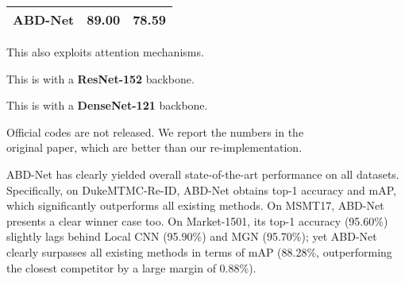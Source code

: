 \documentclass[10pt,twocolumn]{article}
\begin{document}
\begin{table}[ht]
\begin{center}
\begin{threeparttable}
{\begin{tabular}{c|c|c}
\textbf{ABD-Net} & {\color{red}89.00} & {\color{red}78.59} \\
\hline
\end{tabular}}
\begin{tablenotes}
\footnotesize
\item[] This also exploits attention mechanisms.
\item[] This is with a \textbf{ResNet-152} backbone.
\item[] This is with a \textbf{DenseNet-121} backbone.
\item[] Official codes are not released. We report the numbers in the \\ original paper, which are better than our re-implementation. 
\end{tablenotes}
\end{threeparttable}
\end{center}
\vspace{-3mm}
\end{table}

\begin{table}[ht]
\begin{center}
\caption{Comparison to state-of-the-art methods on MSMT17.}
\vspace{0.5em}
\label{table:sota_msmt}
\end{center}
\vspace{-2mm}
\end{table}

ABD-Net has clearly yielded overall state-of-the-art performance on all datasets. Specifically, on DukeMTMC-Re-ID, ABD-Net obtains  top-1 accuracy and  mAP, which significantly outperforms all existing methods. On MSMT17, ABD-Net presents a clear winner case too. On Market-1501, its top-1 accuracy (95.60\%) slightly lags behind Local CNN \cite{yang2018local}  (95.90\%) and MGN \cite{wang2018learning} (95.70\%); yet ABD-Net clearly surpasses all existing methods in terms of mAP (88.28\%, outperforming the closest competitor \cite{yang2018local} by a large margin of 0.88\%). 
\end{document}
